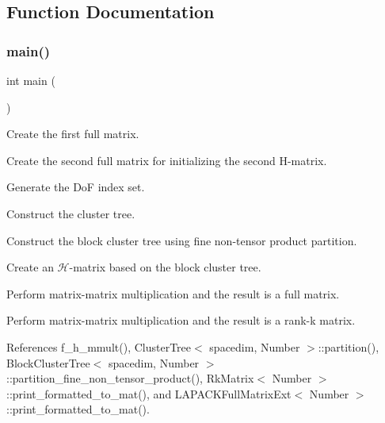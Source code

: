 \subsection{Function Documentation}
\mbox{\label{fullmatrix-hmatrix-mmult_8cc_ae66f6b31b5ad750f1fe042a706a4e3d4}} 
\subsubsection{\texorpdfstring{main()}{main()}}
{\footnotesize\ttfamily int main (\begin{DoxyParamCaption}{ }\end{DoxyParamCaption})}

Create the first full matrix.

Create the second full matrix for initializing the second H-\/matrix.

Generate the DoF index set.

Construct the cluster tree.

Construct the block cluster tree using fine non-\/tensor product partition.

Create an $\mathcal{H}$-\/matrix based on the block cluster tree.

Perform matrix-\/matrix multiplication and the result is a full matrix.

Perform matrix-\/matrix multiplication and the result is a rank-\/k matrix.

References f\+\_\+h\+\_\+mmult(), Cluster\+Tree$<$ spacedim, Number $>$\+::partition(), Block\+Cluster\+Tree$<$ spacedim, Number $>$\+::partition\+\_\+fine\+\_\+non\+\_\+tensor\+\_\+product(), Rk\+Matrix$<$ Number $>$\+::print\+\_\+formatted\+\_\+to\+\_\+mat(), and L\+A\+P\+A\+C\+K\+Full\+Matrix\+Ext$<$ Number $>$\+::print\+\_\+formatted\+\_\+to\+\_\+mat().

